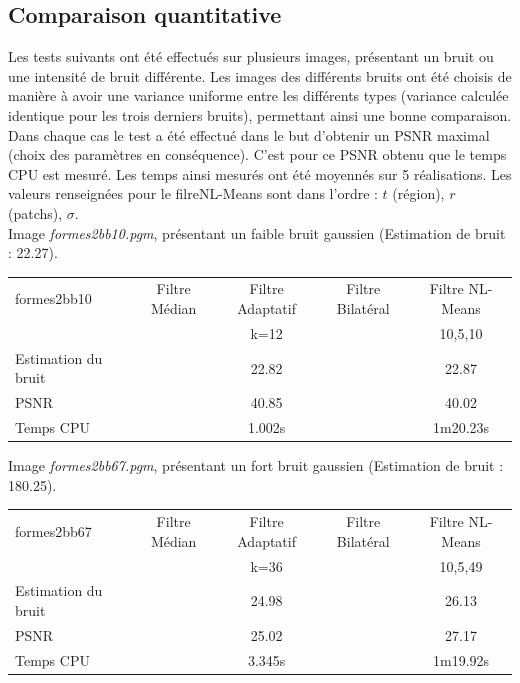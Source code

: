 \documentclass[a4,12pt]{article}
\begin{document}
\subsection{Comparaison quantitative}

Les tests suivants ont été effectués sur plusieurs images, présentant un bruit ou une intensité de bruit différente. Les images des différents bruits ont été choisis de manière à avoir une variance uniforme entre les différents types (variance calculée identique pour les trois derniers bruits), permettant ainsi une bonne comparaison.\\

Dans chaque cas le test a été effectué dans le but d'obtenir un PSNR maximal (choix des paramètres en conséquence). C'est pour ce PSNR obtenu que le temps CPU est mesuré. Les temps ainsi mesurés ont été moyennés sur 5 réalisations. Les valeurs renseignées pour le filreNL-Means sont dans l'ordre : $t$ (région), $r$ (patchs), $\sigma$.\\

Image \textit{formes2bb10.pgm}, présentant un faible bruit gaussien (Estimation de bruit : 22.27).

\begin{center}
\begin{tabular}{|l||c|c|c|c|}
\hline
formes2bb10 & Filtre Médian & Filtre Adaptatif & Filtre Bilatéral & Filtre NL-Means \\
& & k=12 & & 10,5,10\\
\hline
Estimation du bruit
&
& 22.82
&
& 22.87\\
\hline
PSNR
&
& 40.85
&
& 40.02\\
\hline
Temps CPU
& 
& 1.002s
&
& 1m20.23s\\
\hline
\end{tabular} 
\end{center}

\vspace{2em}

Image \textit{formes2bb67.pgm}, présentant un fort bruit gaussien (Estimation de bruit : 180.25).

\begin{center}
\begin{tabular}{|l||c|c|c|c|}
\hline
formes2bb67 & Filtre Médian & Filtre Adaptatif & Filtre Bilatéral & Filtre NL-Means\\
& & k=36 & & 10,5,49\\
\hline
Estimation du bruit
&
& 24.98
&
& 26.13\\
\hline
PSNR
&
& 25.02
&
& 27.17\\
\hline
Temps CPU
&
& 3.345s
&
& 1m19.92s\\
\hline
\end{tabular} 
\end{center}
\end{document}
